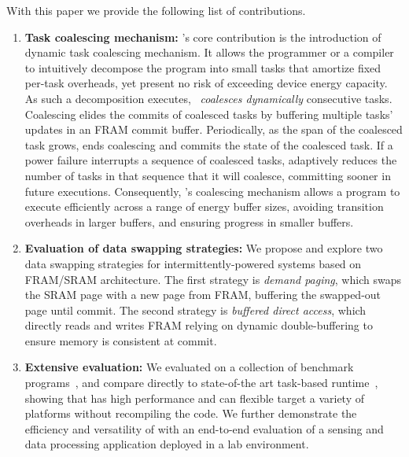With this paper we provide the following list of contributions.
%
\begin{enumerate}
%
\item {\bf Task coalescing mechanism:} \sys's core contribution is the introduction of dynamic task coalescing mechanism. It allows the programmer or a compiler to intuitively decompose the program into small tasks that amortize fixed per-task overheads, yet present no risk of exceeding device energy capacity. As such a decomposition executes, \sys~{\em coalesces dynamically} consecutive tasks. Coalescing elides the commits of coalesced tasks by buffering multiple tasks' updates in an FRAM commit buffer. Periodically, as the span of the coalesced task grows, \sys ends coalescing and commits the state of the coalesced task. If a power failure interrupts a sequence of coalesced tasks, \sys adaptively reduces the number of tasks in that sequence that it will coalesce, committing sooner in future executions. Consequently, \sys's coalescing mechanism allows a program to execute efficiently across a range of energy buffer sizes, avoiding transition overheads in larger buffers, and ensuring progress in smaller buffers.
%
%
\item {\bf Evaluation of data swapping strategies:} We propose and explore two data swapping strategies for intermittently-powered systems based on FRAM/SRAM architecture. The first strategy is {\em demand paging}, which swaps the SRAM page with a new page from FRAM, buffering the swapped-out page until commit. The second strategy is {\em buffered direct access}, which directly reads and writes FRAM relying on dynamic double-buffering to ensure memory is consistent at
commit. 
%
%
\item {\bf Extensive \sys evaluation:} We evaluated \sys on a collection of benchmark programs~\cite[Sec. 5]{chain}, and compare directly to state-of-the art task-based runtime~\cite{chain}, showing that \sys has high performance and can flexible target a variety of platforms without recompiling the code. We further demonstrate the efficiency and versatility of \sys with an end-to-end evaluation of a sensing and data processing application deployed in a lab environment. 
%
%
\end{enumerate}